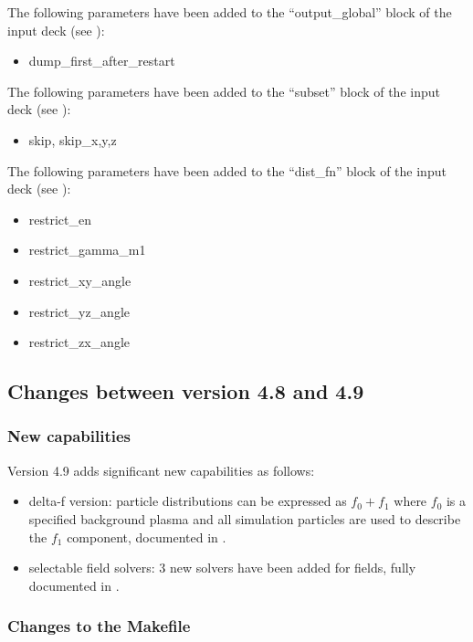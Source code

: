 \noindent The following parameters have been added to the ``output\_global''
block of the input deck (see ):
\begin{itemize}
\item dump\_first\_after\_restart
\end{itemize}
\bigskip

\noindent The following parameters have been added to the ``subset'' block of
the input deck (see ):
\begin{itemize}
\item skip, skip\_{x,y,z}
\end{itemize}
\bigskip

\noindent The following parameters have been added to the ``dist\_fn'' block of
the input deck (see ):
\begin{itemize}
\item restrict\_en
\item restrict\_gamma\_m1
\item restrict\_xy\_angle
\item restrict\_yz\_angle
\item restrict\_zx\_angle
\end{itemize}
\bigskip

\subsection{Changes between version 4.8 and 4.9}

\subsubsection{New capabilities}
Version 4.9 adds significant new capabilities as follows:

\begin{itemize}
\item delta-f version: particle distributions can be expressed as
   $f_0 + f_1$ where $f_0$ is a specified background plasma and all simulation
   particles are used to describe the $f_1$ component, documented in
   .
\item selectable field solvers: 3 new solvers have been added for fields, fully
   documented in .
\end{itemize}
\bigskip

\subsubsection{Changes to the Makefile}

